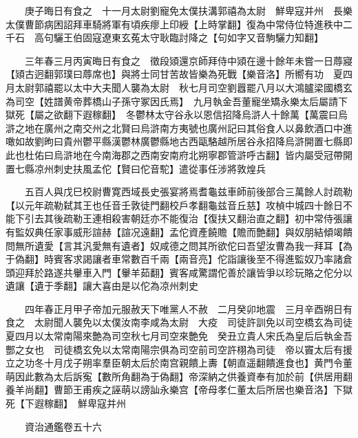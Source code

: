 　　庚子晦日有食之　十一月太尉劉寵免太僕扶溝郭禧為太尉　鮮卑寇并州　長樂太僕曹節病困詔拜車騎將軍有頃疾瘳上印綬【上時掌翻】復為中常侍位特進秩中二千石　高句驪王伯固寇遼東玄菟太守耿臨討降之【句如字又音駒驪力知翻】

　　三年春三月丙寅晦日有食之　徵段熲還京師拜侍中熲在邊十餘年未嘗一日蓐寢【熲古迥翻郭璞曰蓐席也】與將士同甘苦故皆樂為死戰【樂音洛】所嚮有功　夏四月太尉郭禧罷以太中大夫聞人襲為太尉　秋七月司空劉囂罷八月以大鴻臚梁國橋玄為司空【姓譜黄帝葬橋山子孫守冢因氏焉】　九月執金吾董寵坐矯永樂太后屬請下獄死【屬之欲翻下遐稼翻】　冬鬱林太守谷永以恩信招降烏滸人十餘萬【萬震曰烏滸之地在廣州之南交州之北賢曰烏滸南方夷號也廣州記曰其俗食人以鼻飲酒口中進噉如故劉昫曰貴州鬱平縣漢鬱林廣鬱縣地古西甌駱越所居谷永招降烏滸開置七縣即此也杜佑曰烏滸地在今南海郡之西南安南府北朔寧郡管滸呼古翻】皆内屬受冠帶開置七縣凉州刺史扶風孟佗【賢曰佗音駝】遣從事任涉將敦煌兵

　　五百人與戊巳校尉曹寛西域長史張宴將焉耆龜兹車師前後部合三萬餘人討疏勒【以元年疏勒弑其王也任音壬敦徒門翻校戶孝翻龜兹音丘慈】攻楨中城四十餘日不能下引去其後疏勒王連相殺害朝廷亦不能復治【復扶又翻治直之翻】初中常侍張讓有監奴典任家事威形諠赫【諠况遠翻】孟佗資產饒贍【贍而艶翻】與奴朋結傾竭饋問無所遺愛【言其汎愛無有遺者】奴咸德之問其所欲佗曰吾望汝曹為我一拜耳【為于偽翻】時賓客求謁讓者車常數百千兩【兩音亮】佗詣讓後至不得進監奴乃率諸倉頭迎拜於路遂共轝車入門【轝羊茹翻】賓客咸驚謂佗善於讓皆爭以珍玩賂之佗分以遺讓【遺于季翻】讓大喜由是以佗為凉州刺史

　　四年春正月甲子帝加元服赦天下唯黨人不赦　二月癸卯地震　三月辛酉朔日有食之　太尉聞人襲免以太僕汝南李咸為太尉　大疫　司徒許訓免以司空橋玄為司徒　夏四月以太常南陽來艶為司空秋七月司空來艶免　癸丑立貴人宋氏為皇后后執金吾酆之女也　司徒橋玄免以太常南陽宗俱為司空前司空許栩為司徒　帝以竇太后有援立之功冬十月戊子朔率羣臣朝太后於南宫親饋上夀【朝直遥翻饋進食也】黄門令董萌因此數為太后訴寃【數所角翻為于偽翻】帝深納之供養資奉有加於前【供居用翻養羊尚翻】曹節王甫疾之誣萌以謗訕永樂宫【帝母孝仁董太后所居也樂音洛】下獄死【下遐稼翻】　鮮卑寇并州

　　資治通鑑卷五十六


    


 


 



 

 
  








